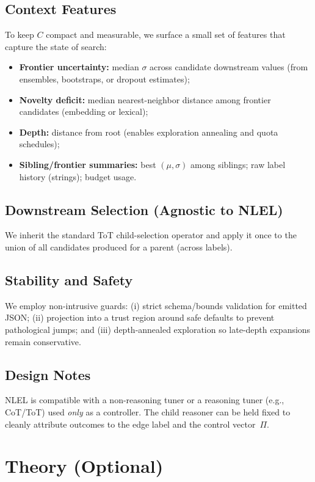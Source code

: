 \documentclass{article}
\theoremstyle{plain}
\theoremstyle{definition}
\theoremstyle{remark}
\begin{document}
\subsection{Context Features}
To keep $C$ compact and measurable, we surface a small set of features that capture the state of search:
\begin{itemize}
  \item \textbf{Frontier uncertainty:} median $\sigma$ across candidate downstream values (from ensembles, bootstraps, or dropout estimates);
  \item \textbf{Novelty deficit:} median nearest-neighbor distance among frontier candidates (embedding or lexical);
  \item \textbf{Depth:} distance from root (enables exploration annealing and quota schedules);
  \item \textbf{Sibling/frontier summaries:} best $(\mu,\sigma)$ among siblings; raw label history (strings); budget usage.
\end{itemize}

\subsection{Downstream Selection (Agnostic to NLEL)}
We inherit the standard ToT child-selection operator and apply it once to the union of all candidates produced for a parent (across labels).
\subsection{Stability and Safety}
We employ non-intrusive guards: (i) strict schema/bounds validation for emitted JSON; (ii) projection into a trust region around safe defaults to prevent pathological jumps; and (iii) depth-annealed exploration so late-depth expansions remain conservative.

\subsection{Design Notes}
NLEL is compatible with a non-reasoning tuner or a reasoning tuner (e.g., CoT/ToT) used \emph{only} as a controller. The child reasoner can be held fixed to cleanly attribute outcomes to the edge label and the control vector~$\Pi$.

\section{Theory (Optional)}
\end{document}
